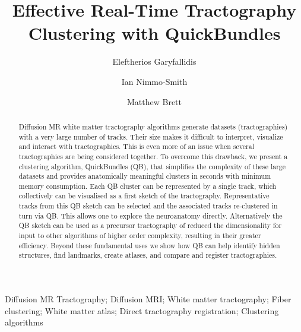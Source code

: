 \documentclass[preprint,authoryear,a4paper,10pt,onecolumn]{elsarticle}
\begin{document}
\begin{frontmatter}

\title{Effective Real-Time Tractography Clustering with QuickBundles}

\author[UC]{Eleftherios Garyfallidis}

\author[CBU]{Ian Nimmo-Smith}

\author[Berkeley]{Matthew Brett}


\address[UC]{University of Cambridge, UK}

\address[CBU]{MRC Cognition and Brain Sciences Unit, Cambridge, UK}

\address[Berkeley]{University of California, Berkeley CA, USA}

\begin{abstract}
  Diffusion MR white matter tractography algorithms generate datasets
  (tractographies) with a very large number of tracks. Their size makes
  it difficult to interpret, visualize and interact with
  tractographies. This is even more of an issue when several
  tractographies are being considered together. To overcome this
  drawback, we present a clustering algorithm, QuickBundles (QB), that
  simplifies the complexity of these large datasets and provides
  anatomically meaningful clusters in seconds with minimum memory
  consumption. Each QB cluster can be represented by a single track,
  which collectively can be visualised as a first sketch of the
  tractography.  Representative tracks from this QB sketch can be
  selected and the associated tracks re-clustered in turn via QB. This
  allows one to explore the neuroanatomy directly. Alternatively the QB
  sketch can be used as a precursor tractography of reduced the
  dimensionality for input to other algorithms of higher order
  complexity, resulting in their greater efficiency. Beyond these
  fundamental uses we show how QB can help identify hidden structures,
  find landmarks, create atlases, and compare and register
  tractographies.
\end{abstract}

\begin{keyword}
Diffusion MR Tractography;
Diffusion MRI;
White matter tractography;
Fiber clustering;
White matter atlas;
Direct tractography registration;
Clustering algorithms
\end{keyword}
\end{frontmatter}
\end{document}
